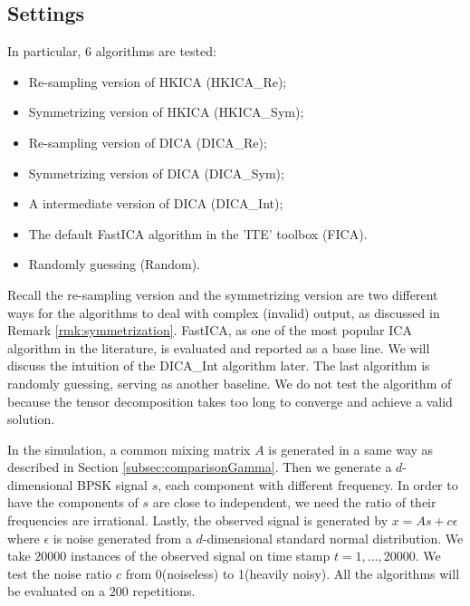 \documentclass[twoside]{article}
\theoremstyle{definition}
\begin{document}
\subsection{Settings}
In particular, 6 algorithms are tested: 
\begin{itemize}
\vspace{-3mm}
\item Re-sampling version of  HKICA (HKICA\_Re);
\item Symmetrizing version of  HKICA  (HKICA\_Sym);
\item Re-sampling version of DICA  (DICA\_Re);
\item Symmetrizing version of  DICA  (DICA\_Sym);
\item A intermediate version of  DICA  (DICA\_Int);
\item The default FastICA algorithm in the 'ITE' toolbox \citep{szabo12separation} (FICA). 
\item  Randomly guessing (Random).
\end{itemize}
\vspace{-3mm}
Recall the re-sampling version and the symmetrizing version are two different ways for the algorithms to deal with complex (invalid) output, as discussed in Remark \ref{rmk:symmetrization}.
FastICA, as one of the most popular ICA algorithm in the literature, is evaluated and reported as a base line. 
We will discuss the intuition of the DICA\_Int algorithm later. 
The last algorithm is randomly guessing, serving as another baseline.
We do not test the algorithm of \citep{anandkumar2012tensordecomposition} because the tensor decomposition takes too long to converge and achieve a valid solution. 

In the simulation, a common mixing matrix $A$ is generated in a same way as described in Section \ref{subsec:comparisonGamma}. 
Then we generate a $d$-dimensional BPSK signal $s$, each component with different frequency. 
In order to have the components of $s$ are close to independent, we need the ratio of their frequencies are irrational. 
Lastly, the observed signal is generated by $x = As+c\epsilon$ where $\epsilon$ is noise generated from a $d$-dimensional standard normal distribution. 
We take $20000$ instances of the observed signal on time stamp $t= 1,\ldots, 20000$.
We test the noise ratio $c$ from 0(noiseless) to 1(heavily noisy). 
All the algorithms will be evaluated on a $200$ repetitions.
\end{document}
